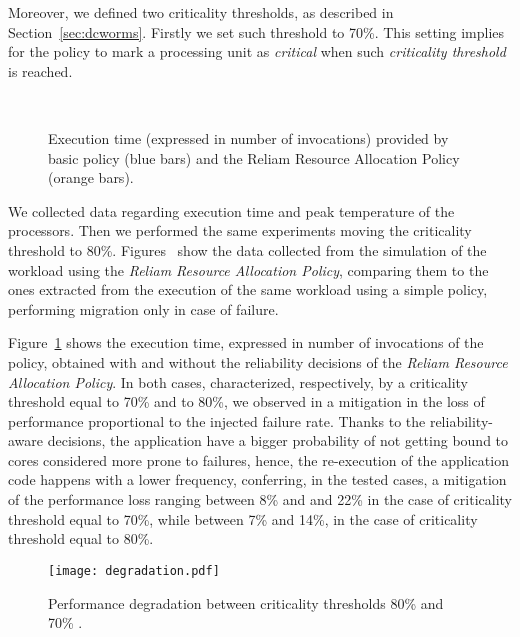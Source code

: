 Moreover, we defined two criticality thresholds, as described in Section~\ref{sec:dcworms}. Firstly we set such threshold to 70\%. This setting implies for the policy to mark a processing unit as \emph{critical} when such \emph{criticality threshold} is reached.

\begin{figure}[t]
    \centering
    \\\hspace{1em}
    \caption{Execution time (expressed in number of invocations) provided by basic policy (blue bars) and the Reliam Resource Allocation Policy (orange bars).}
    \label{fig:exc}%
\end{figure}

We collected data regarding execution time and peak temperature of the processors. Then we performed the same experiments moving the criticality threshold to 80\%. Figures~ show the data collected from the simulation of the workload using the \emph{Reliam Resource Allocation Policy}, comparing them to the ones extracted from the execution of the same workload using a simple policy, performing migration only in case of failure.

Figure~\ref{fig:exc} shows the execution time, expressed in number of invocations of the policy, obtained with and without the reliability decisions of the \emph{Reliam Resource Allocation Policy}. In both cases, characterized, respectively, by a criticality threshold equal to 70\% and to 80\%, we observed in a mitigation in the loss of performance proportional to the injected failure rate. Thanks to the reliability-aware decisions, the application have a bigger probability of not getting bound to cores considered more prone to failures, hence, the re-execution of the application code happens with a lower frequency, conferring, in the tested cases, a mitigation of the performance loss ranging between 8\% and and 22\% in the case of criticality threshold equal to 70\%, while between 7\% and 14\%, in the case of criticality threshold equal to 80\%.

\begin{figure}[t]
    \centering
    \texttt{[image: degradation.pdf]}
    \caption{Performance degradation between criticality thresholds 80\% and 70\% .}
    \label{fig:degradation}
\end{figure}

